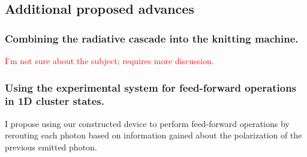 \subsection{Additional proposed advances}
\subsubsection{Combining the radiative cascade into the knitting machine.}
\textcolor{red} {I'm not sure about the subject; requires more discussion. }
\subsubsection{Using the experimental system for feed-forward operations in 1D cluster states.}
I propose using our constructed device to perform feed-forward operations by rerouting each photon based on information gained about the polarization of the previous  emitted photon. 